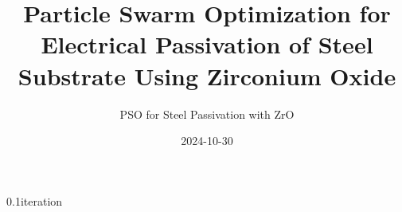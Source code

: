 \documentclass[hyperref={pdfpagelabels=false}, aspectratio=43, t]{beamer}  %
\title{Particle Swarm Optimization for Electrical Passivation of Steel Substrate Using Zirconium Oxide} %
\subtitle{PSO for Steel Passivation with ZrO}  %
\date{2024-10-30} %
\begin{document}

\maketitle

													



\begin{graphicsFrame}{}{}{0.1}{}{iteration}{}\end{graphicsFrame}

\end{document}
